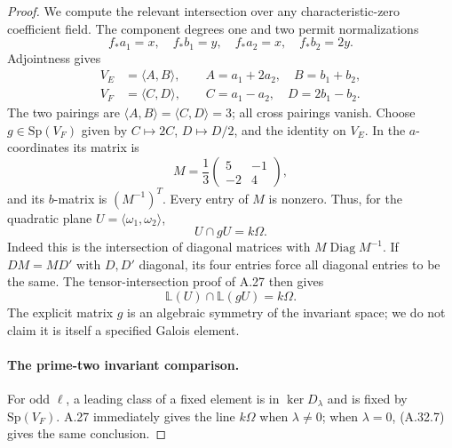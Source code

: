 \begin{proof}
We compute the relevant intersection over any
characteristic-zero coefficient field. The component
degrees one and two permit normalizations
\[
 f_*a_1=x,\quad f_*b_1=y,\quad
 f_*a_2=x,\quad f_*b_2=2y.
\]
Adjointness gives
\[
 \begin{split}
 V_E&=\langle A,B\rangle,
       \qquad A=a_1+2a_2,\quad B=b_1+b_2,\\
 V_F&=\langle C,D\rangle,
       \qquad C=a_1-a_2,\quad D=2b_1-b_2.
 \end{split}                                             \tag{A.32.5}
\]
The two pairings are \(\langle A,B\rangle
=\langle C,D\rangle=3\); all cross pairings vanish.
Choose \(g\in\mathrm{Sp}(V_F)\) given by
\(C\mapsto2C\), \(D\mapsto D/2\), and the identity
on \(V_E\). In the \(a\)-coordinates its matrix is
\[
 M=\frac13\begin{pmatrix}5&-1\\-2&4\end{pmatrix},
\]
and its \(b\)-matrix is \((M^{-1})^T\).
Every entry of \(M\) is nonzero. Thus, for the
quadratic plane \(U=\langle\omega_1,\omega_2\rangle\),
\[
                              U\cap gU=k\Omega.         \tag{A.32.6}
\]
Indeed this is the intersection of diagonal matrices
with \(M\operatorname{Diag}M^{-1}\). If
\(DM=MD'\) with \(D,D'\) diagonal, its four entries
force all diagonal entries to be the same.
The tensor-intersection proof of A.27 then gives
\[
              \mathbb L(U)\cap\mathbb L(gU)=k\Omega.
                                                        \tag{A.32.7}
\]
The explicit matrix \(g\) is an algebraic symmetry
of the invariant space; we do not claim it is itself
a specified Galois element.

\paragraph{The prime-two invariant comparison.}
For odd \(\ell\), a leading class of a fixed element
is in \(\ker D_\lambda\) and is fixed by
\(\mathrm{Sp}(V_F)\). A.27 immediately gives the
line \(k\Omega\) when \(\lambda\ne0\); when
\(\lambda=0\), (A.32.7) gives the same conclusion.


\end{proof}
